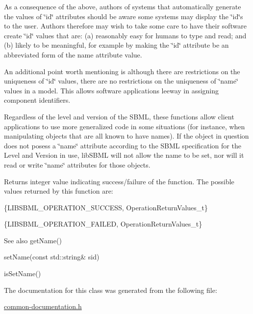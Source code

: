 As a consequence of the above, authors of systems that automatically generate the values of \char`\"{}id\char`\"{} attributes should be aware some systems may display the \char`\"{}id\char`\"{}\textquotesingle{}s to the user. Authors therefore may wish to take some care to have their software create \char`\"{}id\char`\"{} values that are\+: (a) reasonably easy for humans to type and read; and (b) likely to be meaningful, for example by making the \char`\"{}id\char`\"{} attribute be an abbreviated form of the name attribute value.

An additional point worth mentioning is although there are restrictions on the uniqueness of \char`\"{}id\char`\"{} values, there are no restrictions on the uniqueness of \char`\"{}name\char`\"{} values in a model. This allows software applications leeway in assigning component identifiers.

Regardless of the level and version of the S\+B\+ML, these functions allow client applications to use more generalized code in some situations (for instance, when manipulating objects that are all known to have names). If the object in question does not posess a \char`\"{}name\char`\"{} attribute according to the S\+B\+ML specification for the Level and Version in use, lib\+S\+B\+ML will not allow the name to be set, nor will it read or write \char`\"{}name\char`\"{} attributes for those objects.

\begin{DoxyReturn}{Returns}
integer value indicating success/failure of the function. The possible values returned by this function are\+: \begin{DoxyItemize}
\item \{L\+I\+B\+S\+B\+M\+L\+\_\+\+O\+P\+E\+R\+A\+T\+I\+O\+N\+\_\+\+S\+U\+C\+C\+E\+SS, Operation\+Return\+Values\+\_\+t\} \item \{L\+I\+B\+S\+B\+M\+L\+\_\+\+O\+P\+E\+R\+A\+T\+I\+O\+N\+\_\+\+F\+A\+I\+L\+ED, Operation\+Return\+Values\+\_\+t\}\end{DoxyItemize}

\end{DoxyReturn}
\begin{DoxySeeAlso}{See also}
get\+Name() 

set\+Name(const std\+::string\& sid) 

is\+Set\+Name() 
\end{DoxySeeAlso}


The documentation for this class was generated from the following file\+:\begin{DoxyCompactItemize}
\item 
\hyperlink{common-documentation_8h}{common-\/documentation.\+h}\end{DoxyCompactItemize}
